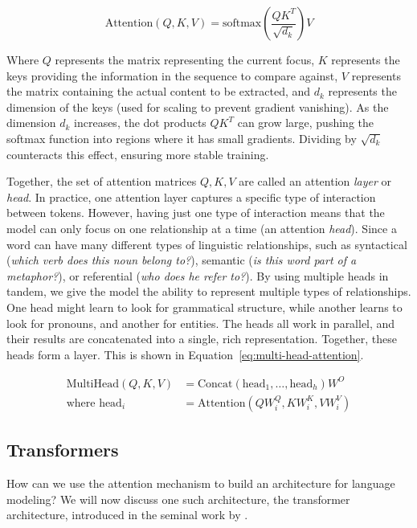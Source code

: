 \begin{equation}
\label{eq:attention}
    \text{Attention}(Q, K, V) = \text{softmax}\left(\frac{QK^T}{\sqrt{d_k}}\right)V
\end{equation}


Where $Q$ represents the matrix representing the current focus, $K$ represents the keys providing the information in the sequence to compare against, $V$ represents the matrix containing the actual content to be extracted, and $d_k$ represents the dimension of the keys (used for scaling to prevent gradient vanishing). As the dimension $d_k$ increases, the dot products $QK^T$ can grow  large, pushing the softmax function into regions where it has  small gradients. Dividing by $\sqrt{d_k}$ counteracts this effect, ensuring more stable training.

Together, the set of attention matrices $Q,K,V$ are called an attention {\em layer} or {\em head}.
In practice, one attention layer   captures a specific type of interaction between tokens. However,  having just one type of interaction means that the model can only focus on one relationship at a time (an attention {\em head}). Since a word can have many different types of linguistic relationships, such as syntactical ({\em which verb does this noun belong to?}), semantic ({\em is this word part of a metaphor?}), or referential ({\em who does {\em he} refer to?}). By using multiple heads in tandem, we give the model the ability to represent multiple types of relationships. One head might learn to look for grammatical structure, while another learns to look for pronouns, and another for entities. The heads all work in parallel, and their results are concatenated into a single, rich representation. Together, these heads form a layer. This is shown in Equation~\ref{eq:multi-head-attention}. 


\begin{align}
    \label{eq:multi-head-attention}
    \text{MultiHead}(Q, K, V) &= \text{Concat}(\text{head}_1, \dots, \text{head}_h)W^O \\
    \nonumber \text{where } \text{head}_i &= \text{Attention}(QW_i^Q, KW_i^K, VW_i^V)    
\end{align}



\subsection{Transformers}
How can we use the attention mechanism to build an architecture for language modeling? We will now discuss one such architecture, the transformer architecture, introduced in the seminal work by \citet{vaswani2017attention}.

